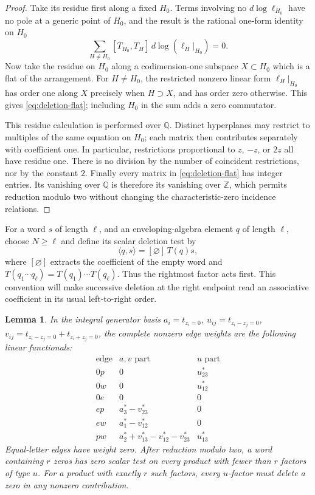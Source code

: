 \documentclass[11pt]{article}
\newtheorem{lemma}[theorem]{Lemma}
\theoremstyle{definition}
\theoremstyle{remark}
\numberwithin{equation}{section}
\begin{document}
\begin{proof}
Take its residue first along a fixed $H_0$.  Terms involving no
$d\log\ell_{H_0}$ have no pole at a generic point of $H_0$, and the
result is the rational one-form identity on $H_0$
\[
 \sum_{H\ne H_0}[T_{H_0},T_H]\,
 d\log(\ell_H|_{H_0})=0.
\]
Now take the residue on $H_0$ along a codimension-one subspace
$X\subset H_0$ which is a flat of the arrangement.  For $H\ne H_0$,
the restricted nonzero linear form $\ell_H|_{H_0}$ has order one along
$X$ precisely when $H\supset X$, and has order zero otherwise.  This
gives \eqref{eq:deletion-flat}; including $H_0$ in the sum adds a zero
commutator.

This residue calculation is performed over $\mathbb Q$.  Distinct hyperplanes
may restrict to multiples of the same equation on $H_0$; each matrix
then contributes separately with coefficient one.  In particular,
restrictions proportional to $z$, $-z$, or $2z$ all have residue one.
There is no division by the number of coincident restrictions, nor by
the constant $2$.  Finally every matrix in \eqref{eq:deletion-flat} has
integer entries.  Its vanishing over $\mathbb Q$ is therefore its vanishing
over $\mathbb Z$, which permits reduction modulo two without changing the
characteristic-zero incidence relations.
\end{proof}

For a word $s$ of length $\ell$, and an enveloping-algebra element $q$
of length $\ell$, choose $N\geq\ell$ and define its scalar deletion test by
\[
 \langle q,s\rangle=[\varnothing]\,T(q)s,
\]
where $[\varnothing]$ extracts the coefficient of the empty word and
$T(q_1\cdots q_\ell)=T(q_1)\cdots T(q_\ell)$.  Thus the rightmost
factor acts first.  This convention will make successive deletion at
the right endpoint read an associative coefficient in its usual
left-to-right order.

\begin{lemma}\label{lem:edge-table}
In the integral generator basis
$a_i=t_{z_i=0}$, $u_{ij}=t_{z_i-z_j=0}$,
$v_{ij}=t_{z_i-z_j=0}+t_{z_i+z_j=0}$, the complete nonzero edge weights
are the following linear functionals:
\begin{equation}\label{eq:deletion-edge-table}
\begin{array}{c|c|c}
\text{edge}&\text{$a,v$ part}&\text{$u$ part}\\ \hline
0p&0&u_{23}^{*}\\
0w&0&u_{12}^{*}\\
0e&0&0\\
ep&a_3^{*}-v_{23}^{*}&0\\
ew&a_1^{*}-v_{12}^{*}&0\\
pw&a_2^{*}+v_{13}^{*}-v_{12}^{*}-v_{23}^{*}&u_{13}^{*}
\end{array}
\end{equation}
Equal-letter edges have weight zero.  After reduction modulo two, a
word containing $r$ zeros has zero scalar test on every product with
fewer than $r$ factors of type $u$.  For a product with exactly $r$ such
factors, every $u$-factor must delete a zero in any nonzero contribution.
\end{lemma}
\end{document}
